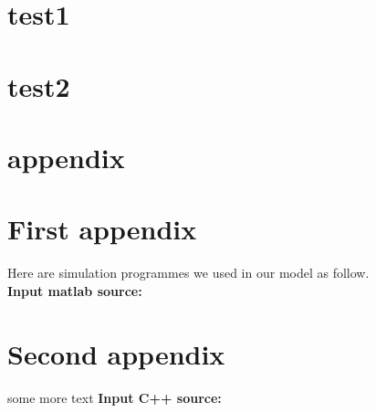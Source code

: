 \documentclass{mcmthesis}
\begin{document}
\section{test1}


\section{test2}


\section{appendix}



\begin{appendices}

\section{First appendix}


Here are simulation programmes we used in our model as follow.\\

\textbf{\textcolor[rgb]{0.98,0.00,0.00}{Input matlab source:}}


\section{Second appendix}

some more text \textcolor[rgb]{0.98,0.00,0.00}{\textbf{Input C++ source:}}


\end{appendices}
\end{document}
